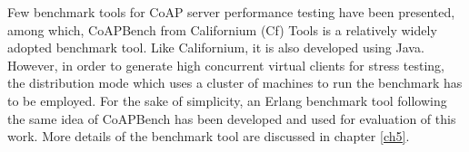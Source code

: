 
Few benchmark tools for CoAP server performance testing have been presented, among which, CoAPBench from Californium (Cf) Tools \cite{coapbench} is a relatively widely adopted benchmark tool. Like Californium, it is also developed using Java. However, in order to generate high concurrent virtual clients for stress testing, the distribution mode which uses a cluster of machines to run the benchmark has to be employed. For the sake of simplicity, an Erlang benchmark tool following the same idea of CoAPBench has been developed and used for evaluation of this work. More details of the benchmark tool are discussed in chapter \ref{ch5}.
